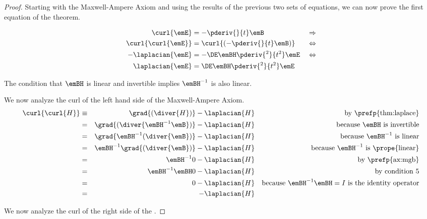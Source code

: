 \begin{proof}
Starting with the Maxwell-Ampere Axiom and using
the results of the previous two sets of equations, we can now prove
the first equation of the theorem.

\begin{align*}
   \curl{\emE}        &= -\pderiv{}{t}\emB                     && \Rightarrow \\
   \curl{\curl{\emE}} &= \curl{(-\pderiv{}{t}\emB)}            && \Leftrightarrow \\
   - \laplacian{\emE} &= -\DE \emBH \pderiv{^2}{t^2}\emE         && \Leftrightarrow \\
   \laplacian{\emE}   &= \DE \emBH \pderiv{^2}{t^2}\emE
\end{align*}



The condition that $\emBH$ is linear and invertible implies $\emBH^{-1}$ is also linear.

We now analyze the curl of the left hand side of the Maxwell-Ampere Axiom.
\begin{align*}
   \curl{\curl{H}}
   &\equiv& \grad{(\diver{H})} - \laplacian{H}
   && \text{by \prefp{thm:laplace}}
   \\ &=&
   \grad{(\diver{\emBH^{-1}\emB})} - \laplacian{H}
   && \text{because $\emBH$ is invertible}
   \\ &=&
   \grad{\emBH^{-1}(\diver{\emB})} - \laplacian{H}
   && \text{because $\emBH^{-1}$ is linear}
   \\ &=&
   \emBH^{-1}\grad{(\diver{\emB})} - \laplacian{H}
   && \text{because $\emBH^{-1}$ is \prope{linear}}
   \\ &=&
   \emBH^{-1}0 - \laplacian{H}
   && \text{by \prefp{ax:mgb}}
   \\ &=&
   \emBH^{-1}\emBH 0 - \laplacian{H}
   && \text{by condition 5}
   \\ &=&
   0 - \laplacian{H}
   && \text{because $\emBH^{-1}\emBH=I$ is the identity operator}
   \\ &=&
   - \laplacian{H}
\end{align*}

We now analyze the curl of the right side of the  .


\end{proof}
